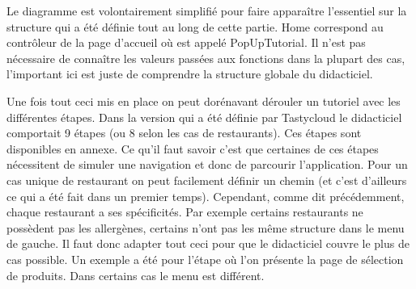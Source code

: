 Le diagramme est volontairement simplifié pour faire apparaître l'essentiel sur la structure qui a été définie tout au long de cette partie. Home correspond au contrôleur de la page d'accueil où est appelé PopUpTutorial. Il n'est pas nécessaire de connaître les valeurs passées aux fonctions dans la plupart des cas, l'important ici est juste de comprendre la structure globale du didacticiel.

Une fois tout ceci mis en place on peut dorénavant dérouler un tutoriel avec les différentes étapes. Dans la version qui a été définie par Tastycloud le didacticiel comportait 9 étapes (ou 8 selon les cas de restaurants). Ces étapes sont disponibles en annexe. Ce qu'il faut savoir c'est que certaines de ces étapes nécessitent de simuler une navigation et donc de parcourir l'application. Pour un cas unique de restaurant on peut facilement définir un chemin (et c'est d'ailleurs ce qui a été fait dans un premier temps). Cependant, comme dit précédemment, chaque restaurant a ses spécificités. Par exemple certains restaurants ne possèdent pas les allergènes, certains n'ont pas les même structure dans le menu de gauche. Il faut donc adapter tout ceci pour que le didacticiel couvre le plus de cas possible. Un exemple a été pour l'étape où l'on présente la page de sélection de produits. Dans certains cas le menu est différent. 

